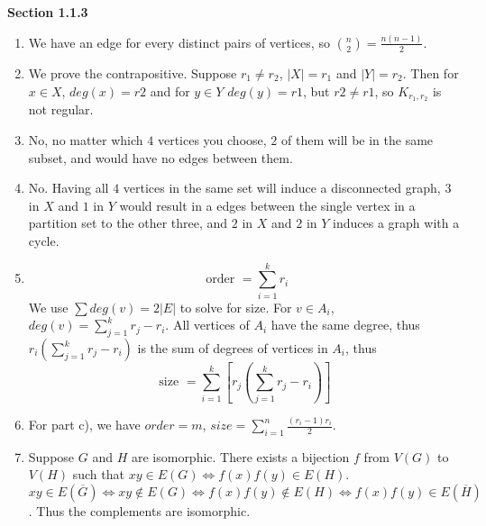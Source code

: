 \documentclass[11pt]{article}
\begin{document}
{\bfseries Section 1.1.3}

\begin{enumerate}[1]
    \item %
        We have an edge for every distinct pairs of vertices, so
        $\binom{n}{2} = \frac{n(n-1)}{2}$.
    \item %
        We prove the contrapositive. Suppose $r_1 \neq r_2$, $|X| = r_1$ and 
        $|Y| = r_2$. Then for $x \in X$, $deg(x) = r2$ and for $y \in Y$ 
        $deg(y) = r1$, but $r2 \neq r1$, so $K_{r_1, r_2}$ is not regular.
    \item %
        No, no matter which $4$ vertices you choose, $2$ of them will be in the 
        same subset, and would have no edges between them. 
    \item %
        No. Having all $4$ vertices in the same set will induce a disconnected
        graph, $3$ in $X$ and $1$ in $Y$ would result in a edges between the 
        single vertex in a partition set to the other three, and $2$ in $X$ 
        and $2$ in $Y$ induces a graph with a cycle.
    \addtocounter{enumi}{1}
    \item %
        $$\text{ order } = \sum_{i = 1}^{k} r_i$$
        We use $\sum deg(v) = 2|E|$ to solve for size. 
        For $v \in A_i$, $deg(v) = \sum_{j = 1}^{k} r_j - r_i$. All vertices
        of $A_i$ have the same degree, thus $r_i(\sum_{j = 1}^{k} r_j - r_i)$ 
        is the sum of degrees of vertices in $A_i$, thus 
        $$ \text{size } = \sum_{i = 1}^{k} [r_j(\sum_{j = 1}^{k} r_j - r_i) ]$$
        
        
    \item %
        For part c), we have $order = m$, $size = \sum^{n}_{i=1} 
        \frac{(r_i - 1)r_i }{2}$.

    \item %
        Suppose $G$ and $H$ are isomorphic. There exists a bijection $f$ from 
        $V(G)$ to $V(H)$ such that $xy \in E(G) \Leftrightarrow f(x)f(y) \in E(H)$. 
        $$xy \in E(\overline{G}) \Leftrightarrow xy \notin E(G) \Leftrightarrow f(x)f(y) \notin E(H) \Leftrightarrow
        f(x)f(y) \in E(\overline{H})$$. Thus the complements are isomorphic.

        
\end{enumerate}
\end{document}
